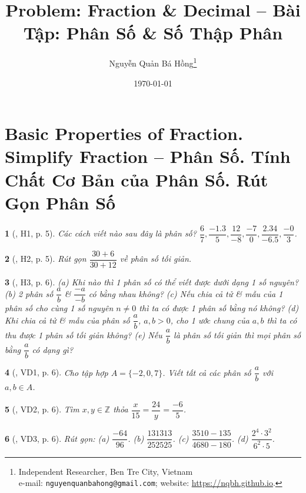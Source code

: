 \documentclass{article}
\title{Problem: Fraction \& Decimal -- Bài Tập: Phân Số \& Số Thập Phân}
\author{Nguyễn Quản Bá Hồng\footnote{Independent Researcher, Ben Tre City, Vietnam\\e-mail: \texttt{nguyenquanbahong@gmail.com}; website: \url{https://nqbh.github.io}.}}
\date{\today}
\newtheorem{baitoan}{}
\begin{document}
\maketitle
\tableofcontents


\section{Basic Properties of Fraction. Simplify Fraction -- Phân Số. Tính Chất Cơ Bản của Phân Số. Rút Gọn Phân Số}

\begin{baitoan}[\cite{Binh_boi_duong_Toan_6_tap_2}, H1, p. 5]
	Các cách viết nào sau đây là phân số? $\dfrac{6}{7},\dfrac{-1.3}{5},\dfrac{12}{-8},\dfrac{-7}{0},\dfrac{2.34}{-6.5},\dfrac{-0}{3}$.
\end{baitoan}

\begin{baitoan}[\cite{Binh_boi_duong_Toan_6_tap_2}, H2, p. 5]
	Rút gọn $\dfrac{30 + 6}{30 + 12}$ về phân số tối giản.
\end{baitoan}

\begin{baitoan}[\cite{Binh_boi_duong_Toan_6_tap_2}, H3, p. 6]
	(a) Khi nào thì 1 phân số có thể viết được dưới dạng 1 số nguyên? (b) 2 phân số $\dfrac{a}{b}$ \& $\dfrac{-a}{-b}$ có bằng nhau không? (c) Nếu chia cả tử \& mẫu của 1 phân số cho cùng 1 số nguyên $n\ne0$ thì ta có được 1 phân số bằng nó không? (d) Khi chia cả tử \& mẫu của phân số $\dfrac{a}{b}$, $a,b > 0$, cho 1 ước chung của $a,b$ thì ta có thu được 1 phân số tối giản không? (e) Nếu $\dfrac{a}{b}$ là phân số tối giản thì mọi phân số bằng $\dfrac{a}{b}$ có dạng gì?
\end{baitoan}

\begin{baitoan}[\cite{Binh_boi_duong_Toan_6_tap_2}, VD1, p. 6]
	Cho tập hợp $A = \{-2,0,7\}$. Viết tất cả các phân số $\dfrac{a}{b}$ với $a,b\in A$.
\end{baitoan}

\begin{baitoan}[\cite{Binh_boi_duong_Toan_6_tap_2}, VD2, p. 6]
	Tìm $x,y\in\mathbb{Z}$ thỏa $\dfrac{x}{15} = \dfrac{24}{y} = \dfrac{-6}{5}$.
\end{baitoan}

\begin{baitoan}[\cite{Binh_boi_duong_Toan_6_tap_2}, VD3, p. 6]
	Rút gọn: (a) $\dfrac{-64}{96}$. (b) $\dfrac{131313}{252525}$. (c) $\dfrac{3510 - 135}{4680 - 180}$. (d) $\dfrac{2^4\cdot3^2}{6^2\cdot5}$.
\end{baitoan}
\end{document}
